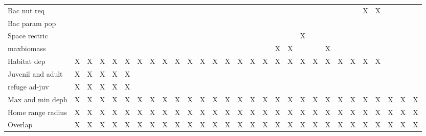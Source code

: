 \documentclass[11pt]{article}
\begin{document}
\begin{center}
\begin{tabular}{lllllllllllllllllllllllllllll}
 Bac nut req         &       &       &       &       &       &       &       &       &       &       &       &       &       &       &       &       &       &       &       &       &       &      &      &  X    &  X    &      &      &      \\
 Bac param pop       &       &       &       &       &       &       &       &       &       &       &       &       &       &       &       &       &       &       &       &       &       &      &      &       &       &      &      &      \\
 Space rectric       &       &       &       &       &       &       &       &       &       &       &       &       &       &       &       &       &       &       &  X    &       &       &      &      &       &       &      &      &      \\
 maxbiomass          &       &       &       &       &       &       &       &       &       &       &       &       &       &       &       &       &  X    &  X    &       &       &  X    &      &      &       &       &      &      &      \\
 Habitat dep         &  X    &  X    &  X    &  X    &  X    &  X    &  X    &  X    &  X    &  X    &  X    &  X    &  X    &  X    &  X    &  X    &  X    &  X    &  X    &  X    &  X    &  X   &  X   &  X    &  X    &      &      &      \\
 Juvenil and adult   &  X    &  X    &  X    &  X    &  X    &       &       &       &       &       &       &       &       &       &       &       &       &       &       &       &       &      &      &       &       &      &      &      \\
 refuge ad-juv       &  X    &  X    &  X    &  X    &  X    &       &       &       &       &       &       &       &       &       &       &       &       &       &       &       &       &      &      &       &       &      &      &      \\
 Max and min deph    &  X    &  X    &  X    &  X    &  X    &  X    &  X    &  X    &  X    &  X    &  X    &  X    &  X    &  X    &  X    &  X    &  X    &  X    &  X    &  X    &  X    &  X   &  X   &  X    &  X    &  X   &  X   &  X   \\
 Home range radius   &  X    &  X    &  X    &  X    &  X    &  X    &  X    &  X    &  X    &  X    &  X    &  X    &  X    &  X    &  X    &  X    &  X    &  X    &  X    &  X    &  X    &  X   &  X   &  X    &  X    &  X   &  X   &  X   \\
 Overlap             &  X    &  X    &  X    &  X    &  X    &  X    &  X    &  X    &  X    &  X    &  X    &  X    &  X    &  X    &  X    &  X    &  X    &  X    &  X    &  X    &  X    &  X   &  X   &  X    &  X    &  X   &  X   &  X   \\

\end{tabular}
\end{center}
\end{document}
